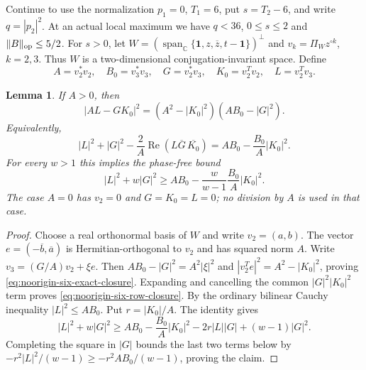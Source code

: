\documentclass[11pt]{article}
\newtheorem{lemma}[theorem]{Lemma}
\theoremstyle{remark}
\numberwithin{equation}{section}
\begin{document}
Continue to use the normalization $p_1=0$, $T_1=6$, put
$s=T_2-6$, and write $q=|p_2|^2$. At an actual local maximum
we have $q<36$, $0\le s\le2$ and $\|B\|_{\rm op}\le5/2$.
For $s>0$, let $W=(\operatorname{span}_{\mathbb C}
\{\mathbf1,z,\overline z,t-\mathbf1\})^\perp$ and
$v_k=\Pi_W z^{\circ k}$, $k=2,3$. Thus $W$ is a
two-dimensional conjugation-invariant space. Define
\[
 A=v_2^*v_2,\quad B_0=v_3^*v_3,\quad G=v_2^*v_3,
 \quad K_0=v_2^Tv_2,\quad L=v_2^Tv_3.
\]

\begin{lemma}\label{lem:noorigin-six-two-dimensional}
If $A>0$, then
\begin{equation}\label{eq:noorigin-six-exact-closure}
 |A L-GK_0|^2=(A^2-|K_0|^2)(AB_0-|G|^2).
\end{equation}
Equivalently,
\begin{equation}\label{eq:noorigin-six-row-closure}
 |L|^2+|G|^2-\frac{2}{A}\operatorname{Re}
       (L\overline G\,\overline{K_0})
       =AB_0-\frac{B_0}{A}|K_0|^2.
\end{equation}
For every $w>1$ this implies the phase-free bound
\begin{equation}\label{eq:noorigin-six-weighted-closure}
 |L|^2+w|G|^2\ge AB_0-
             \frac{w}{w-1}\frac{B_0}{A}|K_0|^2.
\end{equation}
The case $A=0$ has $v_2=0$ and $G=K_0=L=0$; no division by $A$
is used in that case.
\end{lemma}
\begin{proof}
Choose a real orthonormal basis of $W$ and write $v_2=(a,b)$.
The vector $e=(-\overline b,\overline a)$ is Hermitian-orthogonal
to $v_2$ and has squared norm $A$. Write
$v_3=(G/A)v_2+\xi e$. Then
$AB_0-|G|^2=A^2|\xi|^2$ and
$|v_2^Te|^2=A^2-|K_0|^2$, proving
\eqref{eq:noorigin-six-exact-closure}. Expanding and cancelling the
common $|G|^2|K_0|^2$ term proves
\eqref{eq:noorigin-six-row-closure}.
By the ordinary bilinear Cauchy inequality $|L|^2\le AB_0$.
Put $r=|K_0|/A$. The identity gives
\[
 |L|^2+w|G|^2\ge AB_0-\frac{B_0}{A}|K_0|^2
             -2r|L||G|+(w-1)|G|^2.
\]
Completing the square in $|G|$ bounds the last two terms below by
$-r^2|L|^2/(w-1)\ge-r^2AB_0/(w-1)$, proving the claim.
\end{proof}
\end{document}
